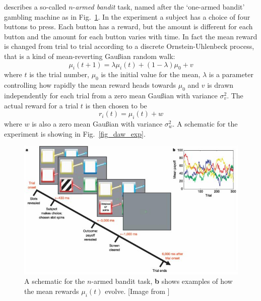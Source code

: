 \documentclass[12pt]{article}
\begin{document}
\citet{DawEtAl2006} describes a so-called $n$-\textsl{armed bandit}
task, named after the \lq{}one-armed bandit\rq{} gambling machine as
in Fig.~\ref{fig_one_armed}. In the experiment a subject has a choice
of four buttons to press. Each button has a reward, but the amount is
different for each button and the amount for each button varies with
time. In fact the mean reward is changed from trial to trial according to a
discrete Ornstein-Uhlenbeck process, that is a kind of mean-reverting
Gau\ss{}ian random walk:
\begin{equation}
\mu_i(t+1)=\lambda \mu_i(t)+(1-\lambda)\mu_0+v
\end{equation}
where $t$ is the trial number, $\mu_0$ is the initial value for the mean,
$\lambda$ is a parameter controlling how rapidly the mean reward heads
towards $\mu_0$ and $v$ is drawn independently for each trial from a
zero mean Gau\ss{}ian with variance $\sigma_v^2$. The actual reward
for a trial $t$ is then chosen to be
\begin{equation}
r_i(t)=\mu_i(t)+w
\end{equation}
where $w$ is also a zero mean Gau\ss{}ian with variance $\sigma_w^2$.
A schematic for the experiment is showing in Fig.~\ref{fig_daw_exp}.

\begin{figure}[htb]
\begin{center}
\includegraphics[width=12cm]{fig_daw_exp.jpg}
\end{center}
\caption{A schematic for the $n$-armed bandit task, \textbf{b} shows examples of how the mean rewards $\mu_i(t)$  evolve. [Image from \citep{DawEtAl2006}]\label{fig_one_armed}}
\end{figure}
\end{document}
